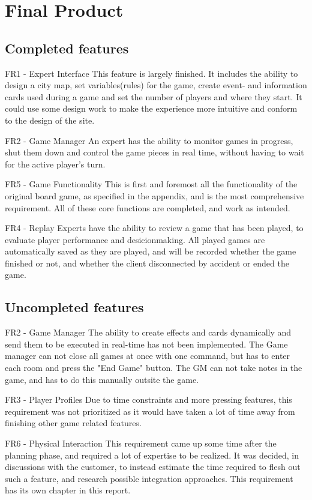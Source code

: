 \chapter{Final Product}

\section{Completed features}
FR1 - Expert Interface
This feature is largely finished. It includes the ability to design a city map, set variables(rules) for the game, create event- and information cards used during a game and set the number of players and where they start. It could use some design work to make the experience more intuitive and conform to the design of the site.

FR2 - Game Manager
An expert has the ability to monitor games in progress, shut them down and control the game pieces in real time, without having to wait for the active player's turn.

FR5 - Game Functionality
This is first and foremost all the functionality of the original board game, as specified in the appendix, and is the most comprehensive requirement. All of these core functions are completed, and work as intended.

FR4 - Replay
Experts have the ability to review a game that has been played, to evaluate player performance and desicionmaking. All played games are automatically saved as they are played, and will be recorded whether the game finished or not, and whether the client disconnected by accident or ended the game.

\section{Uncompleted features}

FR2 - Game Manager
The ability to create effects and cards dynamically and send them to be executed in real-time has not been implemented. The Game manager can not close all games at once with one command, but has to enter each room and press the "End Game" button. The GM can not take notes in the game, and has to do this manually outsite the game.

FR3 - Player Profiles
Due to time constraints and more pressing features, this requirement was not prioritized as it would have taken a lot of time away from finishing other game related features. 

FR6 - Physical Interaction
This requirement came up some time after the planning phase, and required a lot of expertise to be realized. It was decided, in discussions with the customer, to instead estimate the time required to flesh out such a feature, and research possible integration approaches. This requirement has its own chapter in this report.


